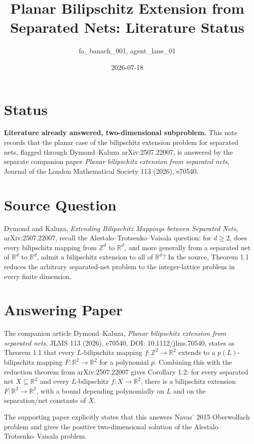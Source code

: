 \documentclass[11pt]{article}
\title{Planar Bilipschitz Extension from Separated Nets: Literature Status}
\author{fa\_banach\_001, agent\_lane\_01}
\date{2026-07-18}
\begin{document}
\maketitle

\section*{Status}

\textbf{Literature already answered, two-dimensional subproblem.}
This note records that the planar case of the bilipschitz extension problem
for separated nets, flagged through Dymond--Kaluza arXiv:2507.22007, is
answered by the separate companion paper
\emph{Planar bilipschitz extension from separated nets}, Journal of the London
Mathematical Society 113 (2026), e70540.

\section*{Source Question}

Dymond and Kaluza, \emph{Extending Bilipschitz Mappings between Separated
Nets}, arXiv:2507.22007, recall the Alestalo--Trotsenko--Vaisala question:
for $d\geq 2$, does every bilipschitz mapping from $\mathbb Z^d$ to
$\mathbb R^d$, and more generally from a separated net of $\mathbb R^d$ to
$\mathbb R^d$, admit a bilipschitz extension to all of $\mathbb R^d$?
In the source, Theorem 1.1 reduces the arbitrary separated-net problem to the
integer-lattice problem in every finite dimension.

\section*{Answering Paper}

The companion article Dymond--Kaluza, \emph{Planar bilipschitz extension from
separated nets}, JLMS 113 (2026), e70540, DOI: 10.1112/jlms.70540, states as
Theorem 1.1 that every $L$-bilipschitz mapping
$f:\mathbb Z^2\to\mathbb R^2$ extends to a $p(L)$-bilipschitz mapping
$F:\mathbb R^2\to\mathbb R^2$ for a polynomial $p$. Combining this with the
reduction theorem from arXiv:2507.22007 gives Corollary 1.2: for every
separated net $X\subseteq \mathbb R^2$ and every $L$-bilipschitz
$f:X\to\mathbb R^2$, there is a bilipschitz extension
$F:\mathbb R^2\to\mathbb R^2$, with a bound depending polynomially on $L$ and
on the separation/net constants of $X$.

The supporting paper explicitly states that this answers Navas' 2015
Oberwolfach problem and gives the positive two-dimensional solution of the
Alestalo--Trotsenko--Vaisala problem.
\end{document}

